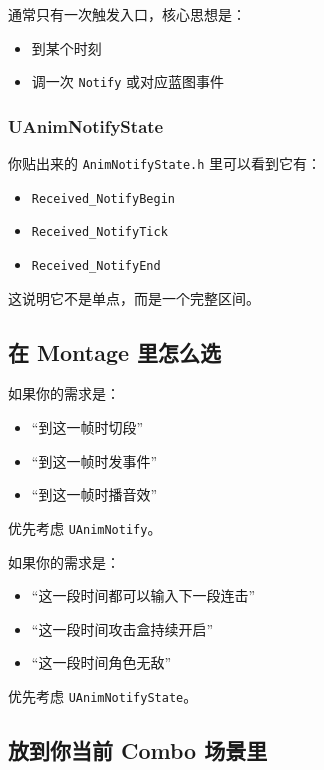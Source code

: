 通常只有一次触发入口，核心思想是：

\begin{itemize}
	\item 到某个时刻
	\item 调一次 \verb|Notify| 或对应蓝图事件
\end{itemize}

\subsubsection{UAnimNotifyState}

你贴出来的 \verb|AnimNotifyState.h| 里可以看到它有：

\begin{itemize}
	\item \verb|Received_NotifyBegin|
	\item \verb|Received_NotifyTick|
	\item \verb|Received_NotifyEnd|
\end{itemize}

这说明它不是单点，而是一个完整区间。

\subsection{在 Montage 里怎么选}

如果你的需求是：

\begin{itemize}
	\item “到这一帧时切段”
	\item “到这一帧时发事件”
	\item “到这一帧时播音效”
\end{itemize}

优先考虑 \verb|UAnimNotify|。

如果你的需求是：

\begin{itemize}
	\item “这一段时间都可以输入下一段连击”
	\item “这一段时间攻击盒持续开启”
	\item “这一段时间角色无敌”
\end{itemize}

优先考虑 \verb|UAnimNotifyState|。

\subsection{放到你当前 Combo 场景里}

